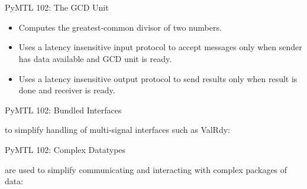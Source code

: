 
\section[{\it Hands-On} GCD Unit]{}

\begin{frame}{PyMTL 102: The GCD Unit}
\begin{itemize}
  \item Computes the greatest-common divisor of two numbers.
  \smallskip
  \item Uses a latency insensitive input protocol to accept messages only
        when sender has data available and GCD unit is ready.
  \smallskip
  \item Uses a latency insensitive output protocol to send results only
        when result is done and receiver is ready.
\end{itemize}

\end{frame}

\begin{frame}{PyMTL 102: Bundled Interfaces}

 to simplify handling of multi-signal interfaces such as
ValRdy:


\end{frame}

\begin{frame}{PyMTL 102: Complex Datatypes}

 are used to simplify communicating and interacting with
complex packages of data:


\end{frame}

